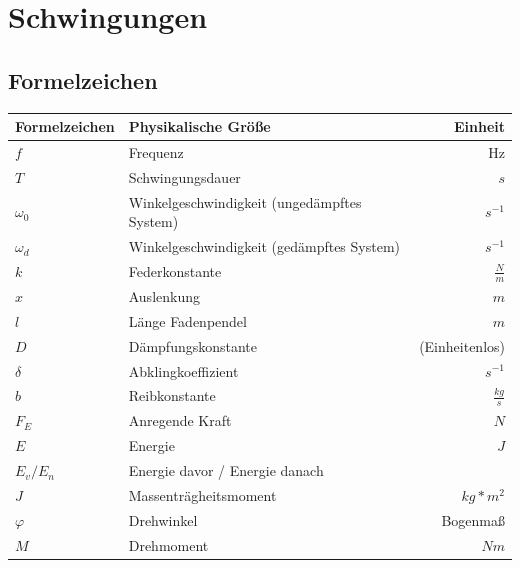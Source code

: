 \documentclass[12pt, a4paper]{scrreprt}
\begin{document}

\tableofcontents
\listoffigures
\newpage
\linespread{1.5} %


\chapter{Schwingungen}

\section{Formelzeichen}

\begin{center}
  \makegapedcells
  \begin{tabular}{l | l | r}
    Formelzeichen & Physikalische Größe & Einheit\\
    \hline \hline
    \(f\) & Frequenz & Hz\\ \hline
    \(T\) & Schwingungsdauer & \(s\)\\ \hline
    \(\omega _0\) & Winkelgeschwindigkeit (ungedämpftes System) & \(s^{-1}\)\\ \hline
    \(\omega _d\) & Winkelgeschwindigkeit (gedämpftes System) & \(s^{-1}\)\\ \hline
    \(k\) & Federkonstante & \(\frac{N}{m}\)\\ \hline
    \(x\) & Auslenkung & \(m\)\\ \hline
    \(l\) & Länge Fadenpendel & \(m\)\\ \hline
    \(D\) & Dämpfungskonstante & (Einheitenlos)\\ \hline
    \(\delta\) & Abklingkoeffizient & \(s^{-1}\)\\ \hline
    \(b\) & Reibkonstante & \(\frac{kg}{s}\)\\ \hline
    \(F_E\) & Anregende Kraft & \(N\)\\ \hline
    \(E\) & Energie & \(J\)\\ \hline
    \(E_v/E_n\) & Energie davor / Energie danach\\ \hline
    \(J\) & Massenträgheitsmoment & \(kg*m^2\)\\ \hline
    \(\varphi\) & Drehwinkel & Bogenmaß\\ \hline
    \(M\) & Drehmoment & \(Nm\)\\ \hline
  \end{tabular}
\end{center}
\end{document}
